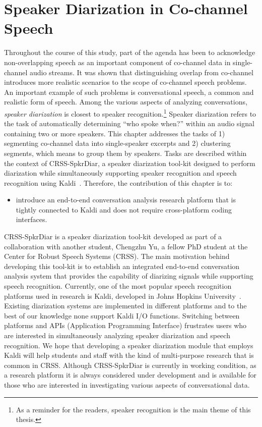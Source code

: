 
\chapter{Speaker Diarization in Co-channel Speech}
\label{chap:spkr_diar}

Throughout the course of this study, part of the agenda has been to acknowledge non-overlapping speech as an important component of co-channel data in single-channel audio streams. 
It was shown that distinguishing overlap from co-channel introduces more realistic scenarios to the scope of co-channel speech problems. 
An important example of such problems is conversational speech, a common and realistic form of speech. 
Among the various aspects of analyzing conversations, {\it speaker diarization} is closest to speaker recognition.\footnote{As a reminder for the readers, speaker recognition is the main theme of this thesis.} 
Speaker diarization refers to the task of automatically determining ``who spoke when?'' within an audio signal containing two or more speakers. 
This chapter addresses the tasks of 1) segmenting co-channel data into single-speaker excerpts and 2) clustering segments, which means to group them by speakers. 
Tasks are described within the context of CRSS-SpkrDiar, a speaker diarization tool-kit designed to perform diarization while simultaneously supporting speaker recognition and speech recognition using Kaldi~\cite{kaldi}. 
Therefore, the contribution of this chapter is to: 
\begin{itemize}
	\item introduce an end-to-end conversation analysis research platform that is tightly connected to Kaldi and does not require cross-platform coding interfaces. 
\end{itemize}

CRSS-SpkrDiar is a speaker diarization tool-kit developed as part of a collaboration with another student, Chengzhu Yu, a fellow PhD student at the Center for Robust Speech Systems (CRSS). 
The main motivation behind developing this tool-kit is to establish an integrated end-to-end conversation analysis system that provides the capability of diarizing  signals while supporting speech recognition. 
Currently, one of the most popular speech recognition platforms used in research is Kaldi, developed in Johns Hopkins University~\cite{kaldi}. 
Existing diarization systems are implemented in different platforms and to the best of our knowledge none support Kaldi I/O functions. 
Switching between platforms and APIs (Application Programming Interface)  frustrates users who are interested in simultaneously analyzing speaker diarization and speech recognition. 
We hope that developing a speaker diarization module that employs Kaldi will help students and staff with the kind of multi-purpose research that is common in CRSS. 
Although CRSS-SpkrDiar is currently in working condition, as a research platform it is always considered under development and is available for those who are interested in investigating various aspects of conversational data. 

